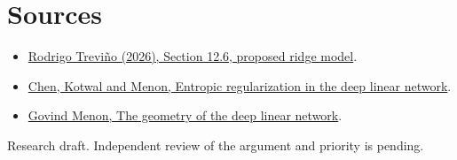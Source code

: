 \documentclass[10pt]{article}
\begin{document}
\section*{Sources}
\begin{itemize}
\item \href{https://arxiv.org/abs/2610.05551}{Rodrigo Treviño (2026), Section 12.6, proposed ridge model}.
\item \href{https://arxiv.org/abs/2512.06137}{Chen, Kotwal and Menon, Entropic regularization in the deep linear network}.
\item \href{https://arxiv.org/abs/2411.09004}{Govind Menon, The geometry of the deep linear network}.
\end{itemize}
{\small Research draft. Independent review of the argument and priority is pending.}
\end{document}
